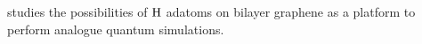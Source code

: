  studies the possibilities of $\ce{H}$ adatoms on bilayer graphene as a platform to perform analogue quantum simulations.

















